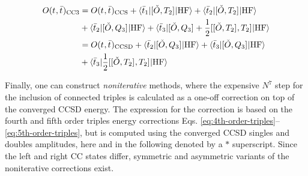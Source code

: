 \begin{equation}\label{eq:cc3-expectation-value}
  \begin{aligned}
  O(t_{}, \bar{t}_{})_\mathrm{CC3}
  &=
  O(t_{}, \bar{t}_{})_\mathrm{CCS}
  + \braket{\bar{t}_{1} | [ \check{O}, T_2 ]^{} | \mathrm{HF} }
  + \braket{\bar{t}_{2} | [ \check{O}, T_2 ]^{} | \mathrm{HF} } \\
  &+
  \braket{\bar{t}_{2} | [ \check{O}, Q_3 ]^{} | \mathrm{HF} }
  + \braket{\bar{t}_{3} |
     [ \check{O}, Q_3 ]^{}
   + \frac{1}{2}[ [ \check{O}, T_2 ]^{}, T_2 ]^{}
                     | \mathrm{HF} } \\
  &=
  O(t_{}, \bar{t}_{})_\mathrm{CCSD}
  +
  \braket{\bar{t}_{2} | [ \check{O}, Q_3 ]^{} | \mathrm{HF} }
  + \braket{\bar{t}_{3} |
     [ \check{O}, Q_3 ]^{}
                     | \mathrm{HF} } \\
  &+ \braket{\bar{t}_{3} |
     \frac{1}{2}[ [ \check{O}, T_2 ]^{}, T_2 ]^{}
                     | \mathrm{HF} }
  \end{aligned}
\end{equation}

Finally, one can construct \emph{noniterative} methods, where the
expensive $N^7$ step for the inclusion of connected triples is
calculated as a one-off correction on top of the converged
\acrshort*{CCSD} energy.
The expression for the correction is based on the fourth and fifth order
triples energy corrections Eqs.
\eqref{eq:4th-order-triples}--\eqref{eq:5th-order-triples}, but is
computed using the converged \acrshort*{CCSD} singles and doubles
amplitudes,\autocite{Urban1985-xp, Raghavachari1989-bn, Bartlett1990-lk,
Watts1993-ff, Kucharski1998-qq, Kucharski1998-oi, Crawford1998-vj,
Taube2008-xv, Taube2008-oq} here and in the following denoted by a $*$
superscript.
Since the left and right \acrshort*{CC} states differ, symmetric and
asymmetric variants of the noniterative corrections exist.

